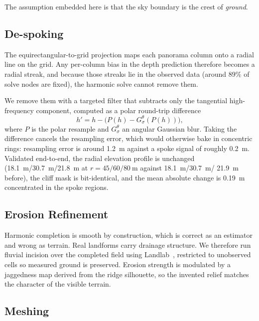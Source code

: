 The assumption embedded here is that the sky boundary is the crest of
\emph{ground}.

\subsection{De-spoking}
\label{sec:despoke}

The equirectangular-to-grid projection maps each panorama column onto a radial
line on the grid. Any per-column bias in the depth prediction therefore becomes a
radial streak, and because those streaks lie in the observed data (around
$89\%$ of solve nodes are fixed), the harmonic solve cannot remove them.

We remove them with a targeted filter that subtracts only the tangential
high-frequency component, computed as a polar round-trip difference
\begin{equation}
  h' = h - \big(P(h) - G_\sigma^{\theta}(P(h))\big),
\end{equation}
where $P$ is the polar resample and $G_\sigma^{\theta}$ an angular Gaussian blur.
Taking the difference cancels the resampling error, which would otherwise bake in
concentric rings: resampling error is around \SI{1.2}{\meter} against a spoke
signal of roughly \SI{0.2}{\meter}. Validated end-to-end, the radial elevation
profile is unchanged (\SI{18.1}{\meter}/\SI{30.7}{\meter}/\SI{21.8}{\meter} at
$r=45/60/\SI{80}{\meter}$ against \SI{18.1}{\meter}/\SI{30.7}{\meter}/%
\SI{21.9}{\meter} before), the cliff mask is bit-identical, and the mean absolute
change is \SI{0.19}{\meter} concentrated in the spoke regions.

\subsection{Erosion Refinement}

Harmonic completion is smooth by construction, which is correct as an estimator
and wrong as terrain. Real landforms carry drainage structure. We therefore run
fluvial incision over the completed field using
Landlab~\cite{barnhart2020landlab,hobley2017creative}, restricted to unobserved
cells so measured ground is preserved. Erosion strength is modulated by a
jaggedness map derived from the ridge silhouette, so the invented relief matches
the character of the visible terrain.

\subsection{Meshing}

